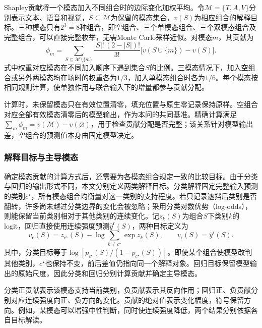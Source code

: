 Shapley贡献将一个模态加入不同组合时的边际变化加权平均\cite{shapley1953value,lundberg2017shap}。令$\mathcal M=\{T,A,V\}$分别表示文本、语音和视觉，$S\subseteq\mathcal M$为保留的模态集合，$v(S)$为相应组合的解释目标。三种模态只有$2^3=8$种组合，即空组合、三个单模态组合、三个双模态组合及完整组合，可以直接完整枚举，无需Monte Carlo采样近似。对模态$m$，其贡献为
\begin{equation}
\phi_m
=\sum_{S\subseteq\mathcal M\setminus\{m\}}
\frac{|S|!\,(2-|S|)!}{3!}
\bigl[v(S\cup\{m\})-v(S)\bigr].
\label{eq:q3_shapley}
\end{equation}
\QThreeParagraph 式中权重对应模态在不同加入顺序下遇到集合$S$的比例。三模态情况下，加入空组合或另外两模态均在场时的权重各为$1/3$，加入单模态组合时各为$1/6$。每个模态按相同规则计算，使单独作用与联合输入下的增量都参与贡献分配。

\QThreeParagraph 计算时，未保留模态只在有效位置清零，填充位置与原生零记录保持原样。空组合对应全部有效模态清零后的模型输出，作为本问的共同基准。精确计算满足$\sum_m\phi_m=v(\mathcal M)-v(\varnothing)$，用于检查贡献分配是否完整；该关系针对模型输出差，空组合的预测值本身由固定模型决定。

\subsubsection{解释目标与主导模态}
\QThreeParagraph 确定模态贡献的计算方式后，还需要为各模态组合规定一致的比较目标。由于分类与回归的输出形式不同，本文分别定义两类解释目标。分类解释固定完整输入预测的类别$c^\star$，所有模态组合均衡量对这一类别的支持程度。若只记录遮挡后类别是否翻转，许多尚未越过分类边界的变化会被忽略；采用分类对数优势（log-odds），则能保留当前类别相对于其他类别的连续变化。记$z_k(S)$为组合$S$下类别$k$的logit，回归直接使用连续强度预测$\widehat y^{\mathrm r}(S)$，两种目标定义为
\begin{equation}
v_{\mathrm c}(S)
=z_{c^\star}(S)-\log\!\sum_{k\ne c^\star}\exp z_k(S),
\qquad
v_{\mathrm r}(S)=\widehat y^{\mathrm r}(S).
\label{eq:q3_value}
\end{equation}
\QThreeParagraph 其中，分类目标等于$\log[p_{c^\star}(S)/(1-p_{c^\star}(S))]$。即使某个组合使模型改判其他类别，$c^\star$也保持不变，前后差值仍指向同一个解释对象。回归目标保留模型输出的原始尺度，因此分类和回归分别计算贡献并确定主导模态。

\QThreeParagraph 分类正贡献表示该模态支持当前类别，负贡献表示其反向作用；回归正、负贡献分别对应连续强度向正、负方向的变化。贡献的绝对值表示变化幅度，符号保留方向。例如，某模态可以增强中性判断，同时使连续强度降低，两个结果分别依据各自目标解读。


